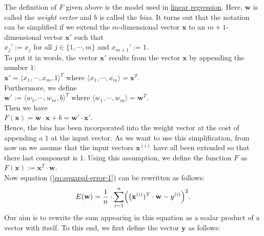 The definition of $F$ given above is the model used in
\href{https://en.wikipedia.org/wiki/Linear_regression}{linear regression}. 
Here, $\mathbf{w}$ is called the \emph{\color{blue}weight vector} and $b$ is called the \emph{\color{blue}bias}.  It turns
out that the notation can be simplified if we extend the $m$-dimensional vector $\mathbf{x}$ to an
$m+1$-dimensional vector $\mathbf{x}'$ such that
\\[0.2cm]
\hspace*{1.3cm}
$x_j' := x_j$ \quad for all $j\in\{1,\cdots,m\}$ \quad and \quad $x_{m+1}' := 1$.
\\[0.2cm]
To put it in words, the vector $\mathbf{x}'$ results from the vector $\mathbf{x}$ by appending the number $1$:
\\[0.2cm]
\hspace*{1.3cm}
$\mathbf{x}' = \langle x_1, \cdots, x_m, 1 \rangle^T$ \quad where $\langle x_1, \cdots, x_m \rangle = \mathbf{x}^T$.
\\[0.2cm]
Furthermore, we define 
\\[0.2cm]
\hspace*{1.3cm}
$\mathbf{w}' := \langle w_1, \cdots, w_m, b \rangle^T$ \quad where $\langle w_1, \cdots, w_m \rangle = \mathbf{w}^T$.
\\[0.2cm]
Then we have
\\[0.2cm]
\hspace*{1.3cm}
$F(\mathbf{x}) = \mathbf{w} \cdot \mathbf{x} + b = \mathbf{w}' \cdot \mathbf{x}'$.
\\[0.2cm]
Hence, the bias has been incorporated into the weight vector at the cost of appending a $1$ at the
input vector.  As we want to use this simplification, from now on we assume that the input vectors
$\mathbf{x}^{(i)}$ have all been extended so that there last component is $1$.  Using this
assumption,  we define the
function $F$ as
\\[0.2cm]
\hspace*{1.3cm}
$F(\mathbf{x}) := \mathbf{x}^T \cdot \mathbf{w}$.
\\[0.2cm]
Now equation (\ref{eq:squared-error-1}) can be rewritten as follows:
\begin{equation}
  \label{eq:squared-error-2}
  E(\mathbf{w}) = \frac{1}{n} \cdot \sum\limits_{i=1}^n \Bigl(\bigl(\mathbf{x}^{(i)})^T \cdot \mathbf{w}  - y^{(i)}\Bigr)^2.
\end{equation}
Our aim is to rewrite the sum appearing in this equation as a scalar product of a vector with
itself.  To this end, we first define the vector $\mathbf{y}$ as follows:
